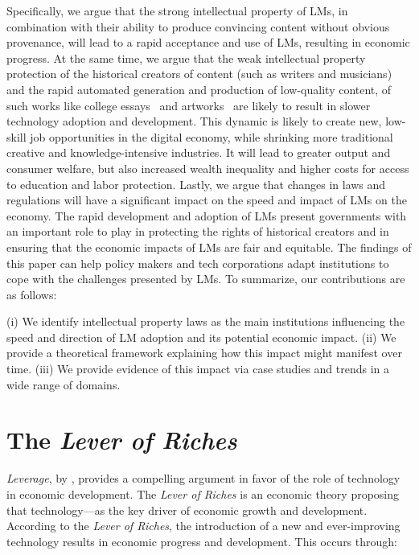 \documentclass{article} %
\begin{document}
Specifically, we argue that the strong intellectual property of LMs, in combination with their ability to produce convincing content without obvious provenance, will lead to a rapid acceptance and use of LMs, resulting in economic progress.
At the same time, we argue that the weak intellectual property protection of the historical creators of content (such as writers and musicians) and the rapid automated generation and production of low-quality content, of such works like college essays~\citep{thompson2022chatgpt} and artworks~\citep{hullman2023artificial} are likely to result in slower technology adoption and development.
This dynamic is likely to create new, low-skill job opportunities in the digital economy, while shrinking more traditional creative and knowledge-intensive industries.
It will lead to greater output and consumer welfare, but also increased wealth inequality and higher costs for access to education and labor protection.
Lastly, we argue that changes in laws and regulations will have a significant impact on the speed and impact of LMs on the economy. 
The rapid development and adoption of LMs present governments with an important role to play in protecting the rights of historical creators and in ensuring that the economic impacts of LMs are fair and equitable. 
The findings of this paper can help policy makers and tech corporations adapt institutions to cope with the challenges presented by LMs. 
To summarize, our contributions are as follows:

    (i) We identify intellectual property laws as the main institutions influencing the speed and direction of LM adoption and its potential economic impact.
    (ii) We provide a theoretical framework explaining how this impact might manifest over time.
    (iii) We provide evidence of this impact via case studies and trends in a wide range of domains.



\section{The \emph{Lever of Riches}}

\label{Prelim}

\emph{Leverage}, by \citet{mokyr1992lever}, provides a compelling argument in favor of the role of technology in economic development.
The \emph{Lever of Riches} is an economic theory proposing that technology---as the key driver of economic growth and development.
According to the \emph{Lever of Riches}, the introduction of a new and ever-improving technology results in economic progress and development.
This occurs through:
\end{document}
